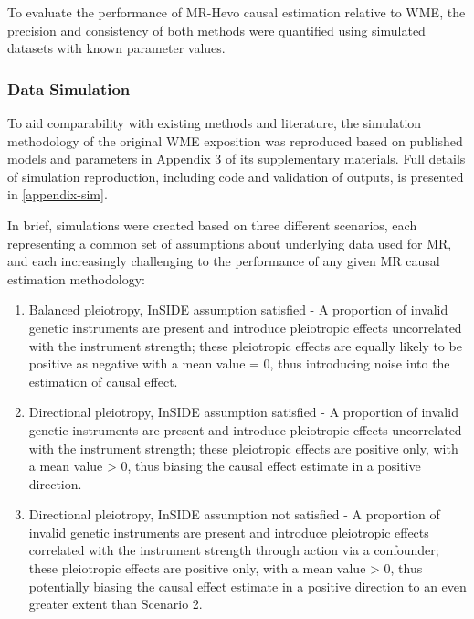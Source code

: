 \documentclass[
]{article}
\begin{document}
To evaluate the performance of MR-Hevo causal estimation relative to WME, the precision and consistency of both methods were quantified using simulated datasets with known parameter values.

\subsubsection{Data Simulation}\label{data-simulation}

To aid comparability with existing methods and literature, the simulation methodology of the original WME exposition was reproduced based on published models and parameters in Appendix 3 of its supplementary materials\textsuperscript{}. Full details of simulation reproduction, including code and validation of outputs, is presented in \ref{appendix-sim}.

In brief, simulations were created based on three different scenarios, each representing a common set of assumptions about underlying data used for MR, and each increasingly challenging to the performance of any given MR causal estimation methodology:

\begin{enumerate}
\def\labelenumi{\arabic{enumi}.}
\item
  Balanced pleiotropy, InSIDE assumption satisfied - A proportion of invalid genetic instruments are present and introduce pleiotropic effects uncorrelated with the instrument strength; these pleiotropic effects are equally likely to be positive as negative with a mean value = 0, thus introducing noise into the estimation of causal effect.
\item
  Directional pleiotropy, InSIDE assumption satisfied - A proportion of invalid genetic instruments are present and introduce pleiotropic effects uncorrelated with the instrument strength; these pleiotropic effects are positive only, with a mean value \textgreater{} 0, thus biasing the causal effect estimate in a positive direction.
\item
  Directional pleiotropy, InSIDE assumption not satisfied - A proportion of invalid genetic instruments are present and introduce pleiotropic effects correlated with the instrument strength through action via a confounder; these pleiotropic effects are positive only, with a mean value \textgreater{} 0, thus potentially biasing the causal effect estimate in a positive direction to an even greater extent than Scenario 2.
\end{enumerate}
\end{document}
